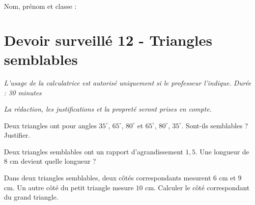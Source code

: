 \documentclass[a4paper,10pt]{report}
\begin{document}
\pagestyle{empty}
\noindent Nom, prénom et classe : \dotfill

\section*{Devoir surveillé 12 - Triangles semblables}

\noindent \textit{L'usage de la calculatrice est autorisé uniquement si le professeur l'indique.} \hfill \textit{Durée : 30 minutes}

\medskip
\noindent \textit{La rédaction, les justifications et la propreté seront prises en compte.}


\begin{ex}[Reconnaître]
Deux triangles ont pour angles $35^\circ$, $65^\circ$, $80^\circ$ et $65^\circ$, $80^\circ$, $35^\circ$. Sont-ils semblables ? Justifier.
\medskip\noindent\grandscarreaux{\linewidth}{3cm}
\end{ex}
\begin{ex}[Rapport]
Deux triangles semblables ont un rapport d'agrandissement $1,5$. Une longueur de $8$ cm devient quelle longueur ?
\medskip\noindent\grandscarreaux{\linewidth}{3cm}
\end{ex}
\begin{ex}
Dans deux triangles semblables, deux côtés correspondants mesurent $6$ cm et $9$ cm. Un autre côté du petit triangle mesure $10$ cm. Calculer le côté correspondant du grand triangle.
\medskip\noindent\grandscarreaux{\linewidth}{4cm}
\end{ex}
\end{document}
